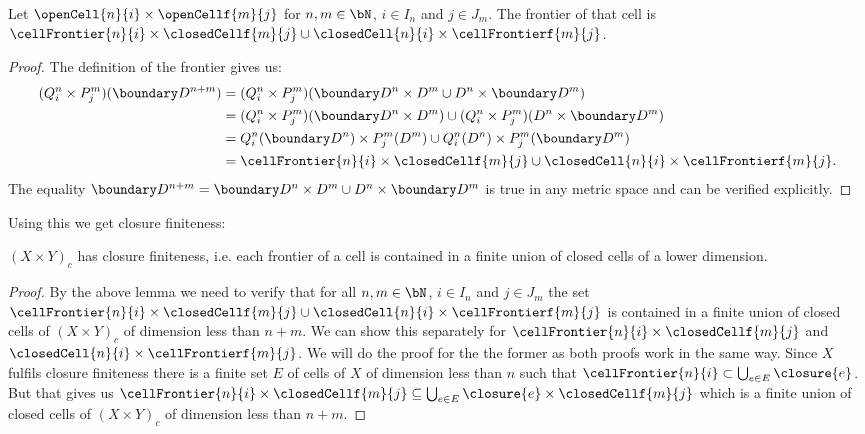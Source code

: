 \begin{lem}
    Let $\openCell{n}{i} \times \openCellf{m}{j}$ for $n, m \in \bN$, $i \in I_n$ and $j \in J_m$. 
    The frontier of that cell is $\cellFrontier{n}{i} \times \closedCellf{m}{j} \cup \closedCell{n}{i} \times \cellFrontierf{m}{j}$. 
    \href{https://github.com/scholzhannah/CWComplexes/blob/7be4872a05b534011cc969eb5b80a4b7f0bf57e2/CWcomplexes/Product.lean#L65-L70}{\faExternalLink}
\end{lem}
\begin{proof}
    The definition of the frontier gives us: 
    \begin{equation*}
        \begin{split}
            (Q_i^n \times P_j^m) (\boundary D^{n + m}) &=  (Q_i^n \times P_j^m) (\boundary D^n \times D^m \cup D^n \times \boundary D^m) \\
            &= (Q_i^n \times P_j^m) (\boundary D^n \times D^m) \cup (Q_i^n \times P_j^m) (D^n \times \boundary D^m) \\
            &= Q_i^n(\boundary D^n) \times P_j^m(D^m) \cup Q_i^n (D^n) \times P_j^m (\boundary D^m) \\
            &= \cellFrontier{n}{i} \times \closedCellf{m}{j} \cup \closedCell{n}{i} \times \cellFrontierf{m}{j}.
        \end{split}
    \end{equation*}
    The equality $\boundary D^{n + m} = \boundary D^n \times D^m \cup D^n \times \boundary D^m$ is true in any metric space and can be verified explicitly.
\end{proof}

Using this we get closure finiteness:

\begin{lem}\label{lem:closurefiniteproduct}
    $(X \times Y)_c$ has closure finiteness, i.e. each frontier of a cell is contained in a finite union of closed cells of a lower dimension.
    \href{https://github.com/scholzhannah/CWComplexes/blob/7be4872a05b534011cc969eb5b80a4b7f0bf57e2/CWcomplexes/Product.lean#L272-L321}{\faExternalLink}
\end{lem}
\begin{proof}
    By the above lemma we need to verify that for all $n, m \in \bN$, $i \in I_n$ and $j \in J_m$ the set $\cellFrontier{n}{i} \times \closedCellf{m}{j} \cup \closedCell{n}{i} \times \cellFrontierf{m}{j}$ is contained in a finite union of closed cells of $(X \times Y)_c$ of dimension less than $n + m$. 
    We can show this separately for $\cellFrontier{n}{i} \times \closedCellf{m}{j}$ and $\closedCell{n}{i} \times \cellFrontierf{m}{j}$. 
    We will do the proof for the the former as both proofs work in the same way. 
    Since $X$ fulfils closure finiteness there is a finite set $E$ of cells of $X$ of dimension less than $n$ such that $\cellFrontier{n}{i} \subset \bigcup_{e \in E}\closure{e}$. 
    But that gives us $\cellFrontier{n}{i} \times \closedCellf{m}{j} \subseteq \bigcup_{e \in E}\closure{e} \times \closedCellf{m}{j}$ which is a finite union of closed cells of $(X \times Y)_c$ of dimension less than $n + m$.
\end{proof}


